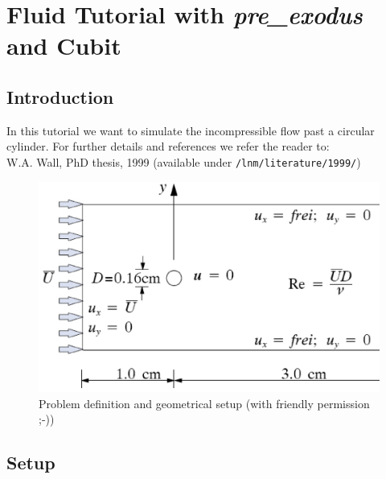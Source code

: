
\newcommand{\prexo}{\emph{pre\_exodus \,}}
\newcommand{\bc}{\emph{bc-file \,}}
\newcommand{\head}{\emph{header-file \,}}

\chapter{Fluid Tutorial with \prexo and Cubit}
\label{tut_fluid_preexo:chap}

\section{Introduction}
In this tutorial we want to simulate the incompressible flow past a circular cylinder.
For further details and references we refer the reader to:\\
W.A. Wall, PhD thesis, 1999
(available under \texttt{/lnm/literature/1999/})
\begin{figure}[h]
\begin{center}
 \includegraphics[scale=0.35]{pics/tut_fluid_problem}
 \caption{Problem definition and geometrical setup (with friendly permission ;-))}
\label{fig:tut_fluid_preexo_setup}
\end{center}
\end{figure}

\section{\baci{} Setup}

